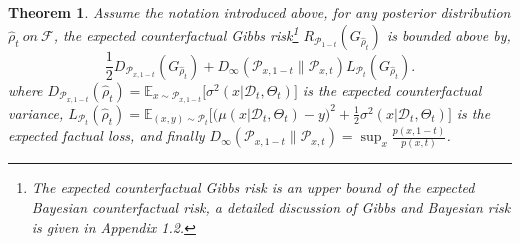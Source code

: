 \documentclass[twoside]{article}
\newtheorem{theorem}{Theorem}
\newcommand{\IPM}{\mathop{\mathrm{IPM}}}
\newcommand{\quo}[1]{\big[#1\big]}
\newcommand{\quooo}[1]{\Big[#1\Big]}
\begin{document}

\begin{theorem}\label{thm:thm2}
Assume the notation introduced above, for any posterior distribution $\hat{\rho}_t \ on \ \mathcal{F}$, the expected counterfactual Gibbs risk\footnote{The expected counterfactual Gibbs risk is an upper bound of the expected Bayesian counterfactual risk, a detailed discussion of Gibbs and Bayesian risk is given in Appendix 1.2.} $R_{\mathcal{P}_{1-t}}(G_{\hat{\rho}_t})$ is bounded above by,	
\begin{equation}\label{equ:thm2}
		\frac{1}{2}D_{\mathcal{P}_{x,1-t}}(G_{\hat{\rho}_t}) + D_{\infty}(\mathcal{P}_{x,1-t}\|\mathcal{P}_{x,t})L_{\mathcal{P}_{t}}(G_{\hat{\rho}_t}).
	\end{equation}
where $D_{\mathcal{P}_{x,1-t}}(\hat{\rho}_t)= \mathbb{E}_{x\sim \mathcal{P}_{x,1-t}} \quo{\sigma^2(x|\mathcal{D}_t,\Theta_t)}$ is the expected counterfactual variance, $L_{\mathcal{P}_t}(\hat{\rho}_t)=  \mathbb{E}_{(x,y)\sim \mathcal{P}_t} \quooo{\big(\mu(x|\mathcal{D}_t,\Theta_t)-y\big)^2 +\frac{1}{2}\sigma^2(x|\mathcal{D}_t,\Theta_t)}$ is the expected factual loss, and finally $D_{\infty}(\mathcal{P}_{x,1-t}\|\mathcal{P}_{x,t})=\sup_{x}\frac{p(x,1-t)}{p(x,t)}$.
\end{theorem}
\end{document}
